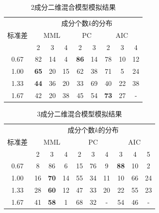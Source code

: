 \documentclass[a4paper,12pt,openany,oneside,utf-8]{ctexbook}
\begin{document}
    \begin{table}[H]
    \centering
    \caption{2成分二维混合模型模拟结果}
    \label{tab1}
    \begin{tabular}{ccccccccc}
    \hline
    \multirow{3}{*}{标准差} & \multicolumn{8}{c}{成分个数$k$的分布}                                                   \\ \cline{2-9} 
                         & \multicolumn{3}{c}{MML} & \multicolumn{2}{c}{PC} & \multicolumn{3}{c}{AIC} \\ \cline{2-9} 
                         & 2            & 3   & 4  & 2              & 3     & 2            & 3   & 4  \\ \hline
    0.67                 & 82           & 14  & 4  & \textbf{86}    & 14    & 78           & 10  & 12 \\ \hline
    1.00                 & \textbf{65}  & 20  & 15 & 62             & 38    & 71           & 5   & 24 \\ \hline
    1.33                 & \textbf{44}  & 36  & 20 & 33             & 69    & 40           & 22  & 38 \\ \hline
    1.67                 & 42           & 20  & 38 & 45             & 54    & \textbf{73}  & 27  & -  \\ \hline
    \end{tabular}
    \end{table}    
    
    
    \begin{table}[H]
    \centering
    \caption{3成分二维混合模型模拟结果}
    \label{tab2}
    \begin{tabular}{cccccccccc}
    \hline
    \multirow{3}{*}{标准差} & \multicolumn{9}{c}{成分个数$k$的分布}                                                   \\ \cline{2-10} 
                         & \multicolumn{3}{c}{MML} & \multicolumn{3}{c}{PC} & \multicolumn{3}{c}{AIC} \\ \cline{2-10} 
                         & 2      & 3      & 4     & 2      & 3     & 4     & 3      & 4      & 5     \\ \hline
    0.67                 & 8      & 86     & 6     & 15     & 76    & 9     & \textbf{88}     & 10     & 2     \\ \hline
    1.00                 & 16     & \textbf{70}     & 14    & 55     & 34    & 11    & 10     & 66      & 24    \\ \hline
    1.33                 & 28     & \textbf{60}     & 12    & 47     & 33    & 20    & 22     & 55    & 23    \\ \hline
    1.67                 & 41     & \textbf{58}     & 1     & 68     & 32    & -     & 54     & 46     & -     \\ \hline
    \end{tabular}
    \end{table}
    
\end{document}

